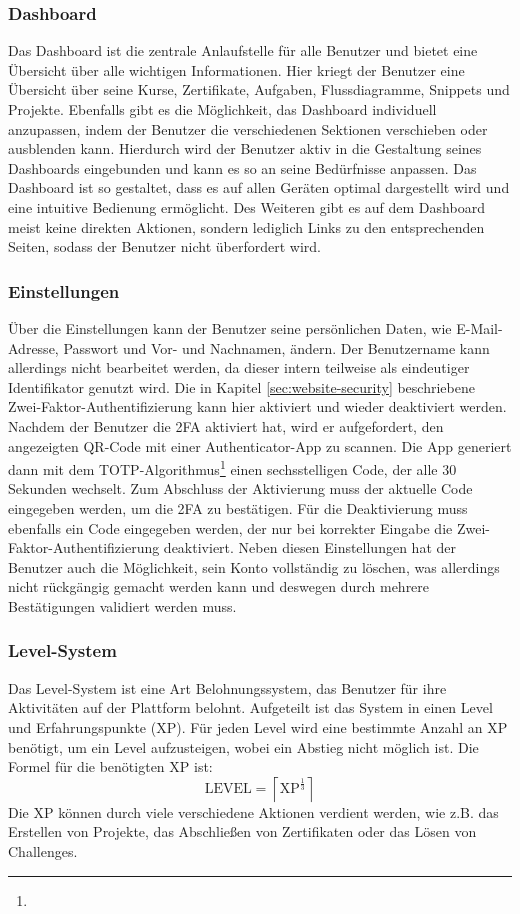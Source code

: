 \documentclass{subfiles}
\begin{document}
\subsubsection{Dashboard}
Das Dashboard ist die zentrale Anlaufstelle für alle Benutzer und bietet eine Übersicht über alle wichtigen Informationen.
Hier kriegt der Benutzer eine Übersicht über seine Kurse, Zertifikate, Aufgaben, Flussdiagramme, Snippets und Projekte.
Ebenfalls gibt es die Möglichkeit, das Dashboard individuell anzupassen, indem der Benutzer die verschiedenen Sektionen verschieben oder ausblenden kann.
Hierdurch wird der Benutzer aktiv in die Gestaltung seines Dashboards eingebunden und kann es so an seine Bedürfnisse anpassen.
Das Dashboard ist so gestaltet, dass es auf allen Geräten optimal dargestellt wird und eine intuitive Bedienung ermöglicht.
Des Weiteren gibt es auf dem Dashboard meist keine direkten Aktionen, sondern lediglich Links zu den entsprechenden Seiten, sodass der Benutzer nicht überfordert wird.

\subsubsection{Einstellungen}
Über die Einstellungen kann der Benutzer seine persönlichen Daten, wie E-Mail-Adresse, Passwort und Vor- und Nachnamen, ändern.
Der Benutzername kann allerdings nicht bearbeitet werden, da dieser intern teilweise als eindeutiger Identifikator genutzt wird.
Die in Kapitel \ref{sec:website-security} beschriebene Zwei-Faktor-Authentifizierung kann hier aktiviert und wieder deaktiviert werden.
Nachdem der Benutzer die 2FA aktiviert hat, wird er aufgefordert, den angezeigten QR-Code mit einer Authenticator-App zu scannen.
Die App generiert dann mit dem TOTP-Algorithmus\footnote{} einen sechsstelligen Code, der alle 30 Sekunden wechselt.
Zum Abschluss der Aktivierung muss der aktuelle Code eingegeben werden, um die 2FA zu bestätigen.
Für die Deaktivierung muss ebenfalls ein Code eingegeben werden, der nur bei korrekter Eingabe die Zwei-Faktor-Authentifizierung deaktiviert.
Neben diesen Einstellungen hat der Benutzer auch die Möglichkeit, sein Konto vollständig zu löschen, was allerdings nicht rückgängig gemacht werden kann und deswegen durch mehrere Bestätigungen validiert werden muss.

\subsubsection{Level-System}
Das Level-System ist eine Art Belohnungssystem, das Benutzer für ihre Aktivitäten auf der Plattform belohnt.
Aufgeteilt ist das System in einen Level und Erfahrungspunkte (XP).
Für jeden Level wird eine bestimmte Anzahl an XP benötigt, um ein Level aufzusteigen, wobei ein Abstieg nicht möglich ist.
Die Formel für die benötigten XP ist:
\begin{equation}
    \text{LEVEL} = \left\lceil \text{XP}^{\frac{1}{3}} \right\rceil
\end{equation}
Die XP können durch viele verschiedene Aktionen verdient werden, wie z.B. das Erstellen von Projekte, das Abschließen von Zertifikaten oder das Lösen von Challenges.
\end{document}

